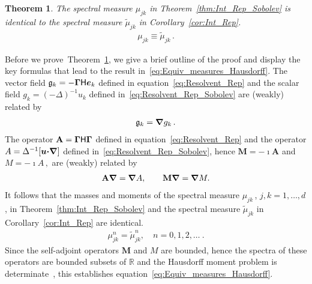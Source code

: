 \documentclass[english,12pt,jmp,graphicx]{revtex4-1}
\newcommand{\vecu}{\boldsymbol{u}}
\newcommand{\vecg}{\mathfrak{g}}
\newcommand{\vece}{\boldsymbol{e}}
\newcommand{\thmref}[1]{Theorem~\ref{#1}}
\newcommand{\corref}[1]{Corollary~\ref{#1}}
\newcommand{\bnabla}{\mbox{\boldmath${\nabla}$}}
\newcommand{\bGamma}{\mbox{\boldmath${\Gamma}$}}
\newcommand{\bcdot}{\mbox{\boldmath${\cdot}$}}
\newtheorem{theorem}{Theorem}
\newcommand{\Hm}{\mathsf{H}}
\newcommand{\Mb}{\mathbf{M}}
\newcommand{\Ab}{\mathbf{A}}
\begin{document}
%
\begin{theorem}\label{thm:Equivalence}
%
The spectral measure $\mu_{jk}$ in \thmref{thm:Int_Rep_Sobolev} is
identical to the spectral measure $\tilde{\mu}_{jk}$ in
\corref{cor:Int_Rep}. 
%
\begin{align}\label{eq:Equiv_measures_Hausdorff}
\mu_{jk}\equiv\tilde{\mu}_{jk}\,.
\end{align}
%  
%
\end{theorem}
%

Before we prove~\thmref{thm:Equivalence}, we give a brief outline of
the proof and display the key formulas that lead to the result
in~\eqref{eq:Equiv_measures_Hausdorff}.
The vector field $\vecg_k=-\bGamma\Hm\vece_k$ defined in 
equation~\eqref{eq:Resolvent_Rep} and the scalar field $g_k=(-\Delta)^{-1}u_k$
defined in~\eqref{eq:Resolvent_Rep_Sobolev} are (weakly) related by~\cite{Murphy:ADSTPF-2017}
%
\begin{align}\label{eq:g_relationship}
\vecg_k=\bnabla g_k\,.
\end{align}
%
The operator $\Ab=\bGamma\Hm\bGamma$ defined in equation~\eqref{eq:Resolvent_Rep} and 
the operator $A=\Delta^{-1}[\vecu\bcdot\bnabla]$ defined 
in~\eqref{eq:Resolvent_Rep_Sobolev}, hence $\Mb=-\imath\Ab$ and 
$M=-\imath A\,,$ are (weakly) related by
%
\begin{align}\label{eq:A_relationship}
\Ab\bnabla = \bnabla A,
\quad\quad
\Mb\bnabla = \bnabla M.
\end{align}
%
It follows that the masses and moments of the spectral measure 
$\mu_{jk}\,$, $j,k=1,\ldots,d$, 
in \thmref{thm:Int_Rep_Sobolev} and the spectral measure $\tilde{\mu}_{jk}$ 
in \corref{cor:Int_Rep} are identical. 
%
\begin{align}\label{eq:moment_equivalence}
\mu_{jk}^n=\tilde{\mu}_{jk}^n, 
\quad 
n=0,1,2,\ldots \ .
\end{align}
%
Since the self-adjoint operators $\Mb$ and $M$ are bounded, hence the
spectra of these operators are bounded subsets of $\mathbb{R}$ and 
the Hausdorff moment problem is 
determinate~\cite{Stone:64,Akhiezer:Book:1965}, 
this establishes equation~\eqref{eq:Equiv_measures_Hausdorff}. 
\end{document}
